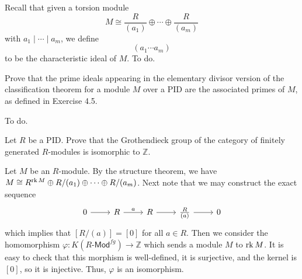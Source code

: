 \documentclass[../../master.tex]{subfiles}
\begin{document}
\begin{solution}
    Recall that given a torsion module
    \[
        M \cong \frac{R}{(a_1)} \oplus \cdots \oplus \frac{R}{(a_m)}
    \]
    with $a_1 \mid \cdots \mid a_m$, we define
    \[
        (a_1 \cdots a_m)
    \]
    to be the characteristic ideal of $M$.
    To do.
\end{solution}

\begin{problem}
    Prove that the prime ideals appearing in the elementary divisor version of the classification theorem for a module $M$ over a PID are the associated primes of $M$, as defined in Exercise 4.5.
\end{problem}

\begin{solution}
    To do.    
\end{solution}

\begin{problem}
    Let $R$ be a PID.
    Prove that the Grothendieck group of the category of finitely generated $R$-modules is isomorphic to $\mathbb{Z}$.
\end{problem}

\begin{solution}
    Let $M$ be an $R$-module.
    By the structure theorem, we have $M \cong R^{\operatorname{rk} M} \oplus R / (a_1) \oplus \cdots \oplus R / (a_m)$.
    Next note that we may construct the exact sequence
    \[
    \begin{tikzcd}
        0 & R & R & \frac{R}{(a)} & 0
        \arrow[from=1-1, to=1-2] 
        \arrow[from=1-2, to=1-3, "a"] 
        \arrow[from=1-3, to=1-4] 
        \arrow[from=1-4, to=1-5] 
    \end{tikzcd}
    \]
    which implies that $[R/(a)] = [0]$ for all $a \in R$.
    Then we consider the homomorphism $\varphi : K(R\text{-}\mathsf{Mod}^{fg}) \to \mathbb{Z}$ which sends a module $M$ to $\operatorname{rk} M$.
    It is easy to check that this morphism is well-defined, it is surjective, and the kernel is $[0]$, so it is injective.
    Thus, $\varphi$ is an isomorphism.
\end{solution}
\end{document}
